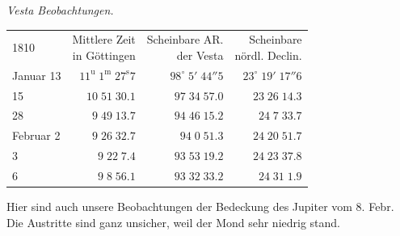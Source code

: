 \begin{center}\emph{Vesta Beobachtungen.}\end{center}
\begin{center}\fontsize{10}{12}\selectfont\setlength{\tabcolsep}{5pt}\renewcommand{\arraystretch}{1.15}\begin{tabular}{lrrr}
1810 & \shortstack{Mittlere Zeit\\in Göttingen} & \shortstack{Scheinbare AR.\\der Vesta} & \shortstack{Scheinbare\\nördl. Declin.}\\
Januar 13 & $11^{\text{u}}\;1^{\text{m}}\;27^{\text{s}}7$ & $98^\circ\;5'\;44''5$ & $23^\circ\;19'\;17''6$\\
15 & $10\;51\;30.1$ & $97\;34\;57.0$ & $23\;26\;14.3$\\
28 & $9\;49\;13.7$ & $94\;46\;15.2$ & $24\;7\;33.7$\\
Februar 2 & $9\;26\;32.7$ & $94\;0\;51.3$ & $24\;20\;51.7$\\
3 & $9\;22\;7.4$ & $93\;53\;19.2$ & $24\;23\;37.8$\\
6 & $9\;8\;56.1$ & $93\;32\;33.2$ & $24\;31\;1.9$\\
\end{tabular}\end{center}

\par\indent Hier sind auch unsere Beobachtungen der Bedeckung des Jupiter vom 8. Febr. Die Austritte sind ganz unsicher, weil der Mond sehr niedrig stand.

